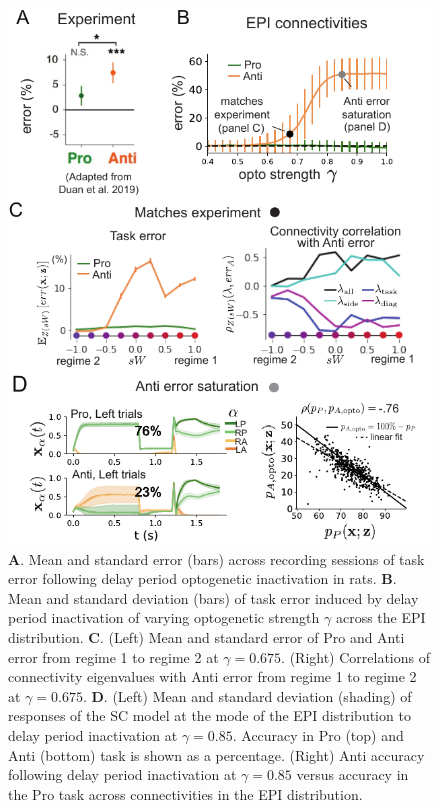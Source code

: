 \documentclass[11pt]{article}
\begin{document}
\begin{figure}
\begin{center}
\includegraphics[scale=1.1]{figures/fig5/fig5.pdf}
\end{center}
\caption{ 
\textbf{A}. Mean and standard error (bars) across recording sessions of task error following delay period optogenetic inactivation in rats.
\textbf{B}. Mean and standard deviation (bars) of task error induced by delay period inactivation of varying optogenetic strength $\gamma$ across the EPI distribution.
\textbf{C}. (Left) Mean and standard error of Pro and Anti error from regime 1 to regime 2 at $\gamma = 0.675$.
(Right) Correlations of connectivity eigenvalues with Anti error from regime 1 to regime 2 at $\gamma = 0.675$.
\textbf{D}. (Left) Mean and standard deviation (shading) of responses of the SC model at the mode of the EPI distribution to delay period inactivation at $\gamma = 0.85$.  Accuracy in Pro (top) and Anti (bottom) task is shown as a percentage. (Right) Anti accuracy following delay period inactivation at $\gamma = 0.85$ versus accuracy in the Pro task across connectivities in the EPI distribution.
}
\label{fig:SC_opto}
\end{figure}
\end{document}
